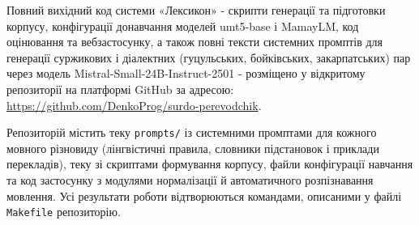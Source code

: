 \documentclass[14pt]{extarticle}
\begin{document}
Повний вихідний код системи «Лексикон» - скрипти генерації та підготовки корпусу, конфігурації донавчання моделей umt5-base і MamayLM, код оцінювання та вебзастосунку, а також повні тексти системних промптів для генерації суржикових і діалектних (гуцульських, бойківських, закарпатських) пар через модель Mistral-Small-24B-Instruct-2501 - розміщено у відкритому репозиторії на платформі GitHub за адресою: \url{https://github.com/DenkoProg/surdo-perevodchik}.

Репозиторій містить теку \texttt{prompts/} із системними промптами для кожного мовного різновиду (лінгвістичні правила, словники підстановок і приклади перекладів), теку зі скриптами формування корпусу, файли конфігурації навчання та код застосунку з модулями нормалізації й автоматичного розпізнавання мовлення. Усі результати роботи відтворюються командами, описаними у файлі \texttt{Makefile} репозиторію.
\end{document}
